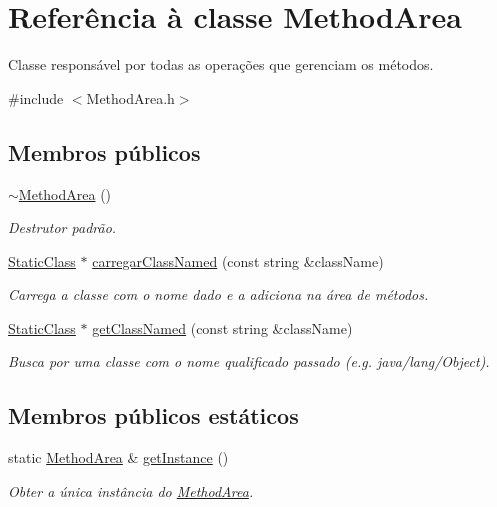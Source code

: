 \hypertarget{classMethodArea}{}\section{Referência à classe Method\+Area}
\label{classMethodArea}


Classe responsável por todas as operações que gerenciam os métodos.  




{\ttfamily \#include $<$Method\+Area.\+h$>$}

\subsection*{Membros públicos}
\begin{DoxyCompactItemize}
\item 
\hyperlink{classMethodArea_a79edf80f07f068f918907d8e2a3508b7}{$\sim$\+Method\+Area} ()
\begin{DoxyCompactList}\small\item\em Destrutor padrão. \end{DoxyCompactList}\item 
\hyperlink{classStaticClass}{Static\+Class} $\ast$ \hyperlink{classMethodArea_a6e5cd27f3133d70a8c56c5daf9190ba6}{carregar\+Class\+Named} (const string \&class\+Name)
\begin{DoxyCompactList}\small\item\em Carrega a classe com o nome dado e a adiciona na área de métodos. \end{DoxyCompactList}\item 
\hyperlink{classStaticClass}{Static\+Class} $\ast$ \hyperlink{classMethodArea_a1fb65cf5f35cadbe2be8ad1aece57025}{get\+Class\+Named} (const string \&class\+Name)
\begin{DoxyCompactList}\small\item\em Busca por uma classe com o nome qualificado passado (e.\+g. java/lang/\+Object). \end{DoxyCompactList}\end{DoxyCompactItemize}
\subsection*{Membros públicos estáticos}
\begin{DoxyCompactItemize}
\item 
static \hyperlink{classMethodArea}{Method\+Area} \& \hyperlink{classMethodArea_ab5fadec94ada20bc6381e7e9ac766cad}{get\+Instance} ()
\begin{DoxyCompactList}\small\item\em Obter a única instância do \hyperlink{classMethodArea}{Method\+Area}. \end{DoxyCompactList}\end{DoxyCompactItemize}
